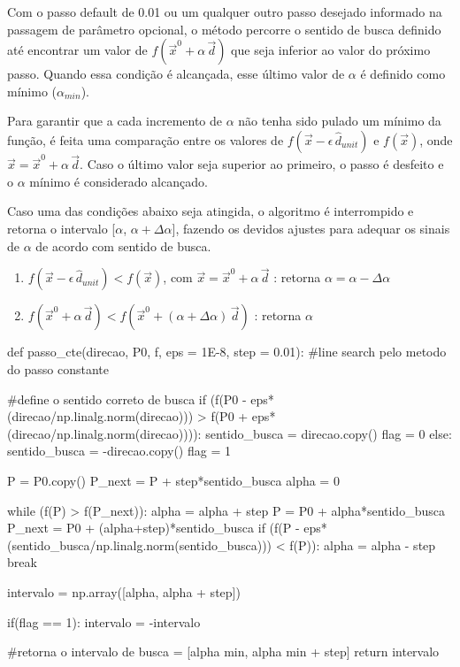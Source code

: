 \documentclass[10pt, a4paper]{article}
\begin{document}
Com o passo default de 0.01 ou um qualquer outro passo desejado informado na passagem de parâmetro opcional,
o método percorre o sentido de busca definido até encontrar um valor de
$f(\overrightarrow{x}^0+ \alpha\,\overrightarrow{d})$ que seja inferior ao valor do próximo passo.
Quando essa condição é alcançada, esse último valor de $\alpha$ é definido como mínimo ($\alpha_{min}$). 

Para garantir que a cada incremento de $\alpha$ não tenha sido pulado um mínimo da função,
é feita uma comparação entre os valores de $f(\overrightarrow{x}-\epsilon\,\hat{d}_{unit})$ e $f(\overrightarrow{x})$, 
onde $\overrightarrow{x} = \overrightarrow{x}^0 + \alpha\,\overrightarrow{d}$.
Caso o último valor seja superior ao primeiro, o passo é desfeito e o $\alpha$ mínimo é considerado alcançado.

Caso uma das condições abaixo seja atingida, o algoritmo é interrompido e
retorna o intervalo [$\alpha$,  $\alpha + \Delta\alpha$],
fazendo os devidos ajustes para adequar os sinais de $\alpha$ de acordo com sentido de busca.

\begin{enumerate}
  \item $f(\overrightarrow{x}-\epsilon\,\hat{d}_{unit}) < f(\overrightarrow{x})$,
  com $\overrightarrow{x} = \overrightarrow{x}^0 + \alpha\,\overrightarrow{d}$ : retorna $\alpha = \alpha - \Delta \alpha$
  \item $f(\overrightarrow{x}^0+ \alpha\,\overrightarrow{d}) < f(\overrightarrow{x}^0 +
  (\alpha + \Delta\alpha)\,\overrightarrow{d})$ : retorna $\alpha$  
\end{enumerate}


\begin{python}
  def passo_cte(direcao, P0, f, eps = 1E-8, step = 0.01):
    #line search pelo metodo do passo constante
      
    #define o sentido correto de busca
    if (f(P0 - eps*(direcao/np.linalg.norm(direcao))) > f(P0 + eps*(direcao/np.linalg.norm(direcao)))):
        sentido_busca = direcao.copy()
        flag = 0
    else:
        sentido_busca = -direcao.copy()
        flag = 1
        
    P = P0.copy()
    P_next = P + step*sentido_busca
    alpha = 0
   
    while (f(P) > f(P_next)):           
        alpha = alpha + step
        P = P0 + alpha*sentido_busca
        P_next = P0 + (alpha+step)*sentido_busca
        if (f(P - eps*(sentido_busca/np.linalg.norm(sentido_busca))) < f(P)):
            alpha = alpha - step
            break
    
    intervalo = np.array([alpha, alpha + step])
    
    if(flag == 1):
        intervalo = -intervalo
        
    #retorna o intervalo de busca = [alpha min, alpha min + step]                 
    return intervalo
\end{python}
\end{document}
